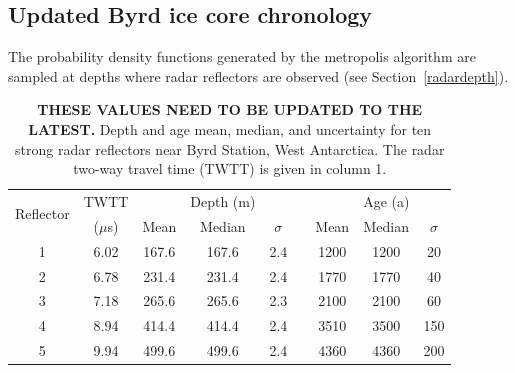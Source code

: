 \subsection{Updated Byrd ice core chronology}\label{agedepthresults}

The probability density functions generated by the metropolis algorithm are sampled at depths where radar reflectors are observed (see Section~\ref{radardepth}).

\begin{table}[h]
\centering
\begin{tabular}{ c c c c c c c c c }
\cline{1-9}
\multirow{2}{*}{Reflector} & TWTT&  & Depth (m) & & & & Age (a)&\\   

& ($\mu$s)& Mean & Median & $\sigma$ & & Mean & Median & $\sigma$ \\
\cline{3-5} \cline{7-9}
 1 & 6.02   & 167.6  & 167.6  & 2.4 & &1200 & 1200 & 20   \\
 2 & 6.78   & 231.4  & 231.4  & 2.4 & &1770 & 1770 & 40   \\
 3 & 7.18   & 265.6  & 265.6  & 2.3 & &2100 & 2100 & 60  \\
 4 & 8.94   & 414.4  & 414.4  & 2.4 & &3510 & 3500 & 150   \\
 5 & 9.94   & 499.6  & 499.6  & 2.4 & &4360 & 4360 & 200   \\
\cline{1-9}
\end{tabular}
\captionsetup{width=.9\textwidth}
\caption{\textbf{THESE VALUES NEED TO BE UPDATED TO THE LATEST.} Depth and age mean, median, and uncertainty for ten strong radar reflectors near Byrd Station, West Antarctica. The radar two-way travel time (TWTT) is given in column 1. }
\label{tab:depthunc}
\end{table}




